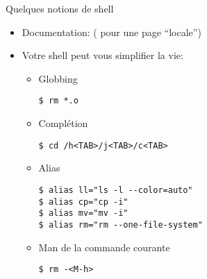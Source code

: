 \begin{frame}[fragile=singleslide]{Quelques notions de shell}
  \begin{itemize}
  \item   Documentation:    (  pour   une  page
    ``locale'')
  \item Votre shell peut vous simplifier la vie:
    \begin{itemize}
    \item Globbing
      \begin{lstlisting}
$ rm *.o
      \end{lstlisting}
    \item Complétion 
      \begin{lstlisting}
$ cd /h<TAB>/j<TAB>/c<TAB>
      \end{lstlisting}
    \item Alias
\begin{lstlisting}
$ alias ll="ls -l --color=auto"
$ alias cp="cp -i"              
$ alias mv="mv -i"              
$ alias rm="rm --one-file-system"
\end{lstlisting} %
    \item Man de la commande courante
\begin{lstlisting}
$ rm -<M-h>
\end{lstlisting} %
    \end{itemize}
  \end{itemize}
\end{frame}

